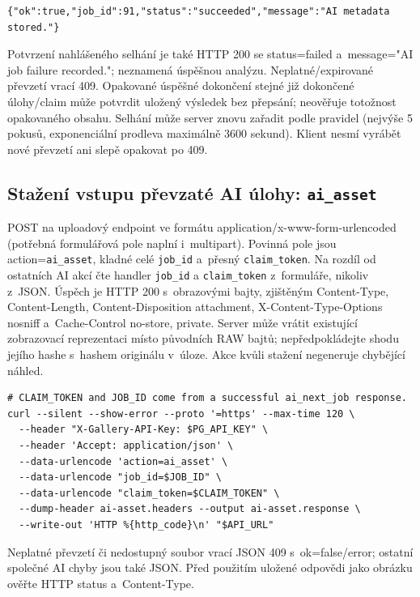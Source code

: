 \documentclass[11pt,a4paper]{article}
\newcommand{\codeword}[1]{\nolinkurl{#1}}
\begin{document}
\begin{lstlisting}[language={}]
{"ok":true,"job_id":91,"status":"succeeded","message":"AI metadata stored."}
\end{lstlisting}

Potvrzení nahlášeného selhání je také HTTP 200 se status=failed a~message="AI job failure
recorded."; neznamená úspěšnou analýzu. Neplatné/expirované převzetí vrací 409. Opakované
úspěšné dokončení stejné již dokončené úlohy/claim může potvrdit uložený výsledek bez
přepsání; neověřuje totožnost opakovaného obsahu. Selhání může server znovu zařadit podle
pravidel (nejvýše 5 pokusů, exponenciální prodleva maximálně 3600 sekund). Klient nesmí
vyrábět nové převzetí ani slepě opakovat po 409.

\subsection{\texorpdfstring{Stažení vstupu převzaté AI úlohy: \codeword{ai_asset}}{Stažení vstupu převzaté AI úlohy: ai\_asset}}

\label{api352:ai-asset}

POST na uploadový endpoint ve formátu application/x-www-form-urlencoded (potřebná
formulářová pole naplní i~multipart). Povinná pole jsou action=\codeword{ai_asset}, kladné
celé \codeword{job_id} a~přesný \codeword{claim_token}. Na rozdíl od ostatních AI akcí čte
handler \codeword{job_id} a \codeword{claim_token} z~formuláře, nikoliv z~JSON. Úspěch je
HTTP 200 s~obrazovými bajty, zjištěným Content-Type, Content-Length, Content-Disposition
attachment, X-Content-Type-Options nosniff a~Cache-Control no-store, private. Server může
vrátit existující zobrazovací reprezentaci místo původních RAW bajtů; nepředpokládejte shodu
jejího hashe s~hashem originálu v~úloze. Akce kvůli stažení negeneruje chybějící náhled.

\begin{lstlisting}[language={}]
# CLAIM_TOKEN and JOB_ID come from a successful ai_next_job response.
curl --silent --show-error --proto '=https' --max-time 120 \
  --header "X-Gallery-API-Key: $PG_API_KEY" \
  --header 'Accept: application/json' \
  --data-urlencode 'action=ai_asset' \
  --data-urlencode "job_id=$JOB_ID" \
  --data-urlencode "claim_token=$CLAIM_TOKEN" \
  --dump-header ai-asset.headers --output ai-asset.response \
  --write-out 'HTTP %{http_code}\n' "$API_URL"
\end{lstlisting}

Neplatné převzetí či nedostupný soubor vrací JSON 409 s~ok=false/error; ostatní společné AI
chyby jsou také JSON. Před použitím uložené odpovědi jako obrázku ověřte HTTP status
a~Content-Type.
\end{document}
